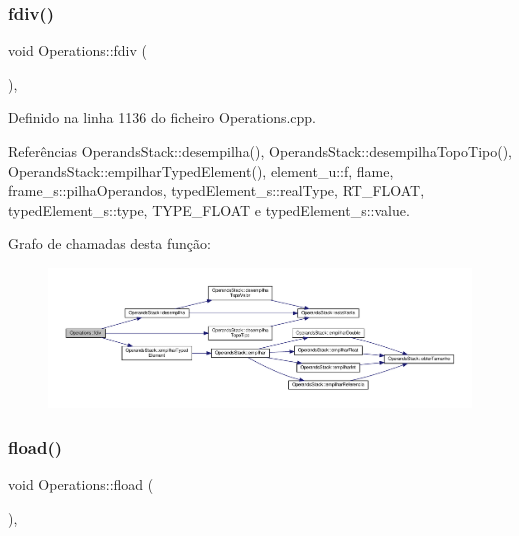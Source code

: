 \subsubsection{\texorpdfstring{fdiv()}{fdiv()}}
{\footnotesize\ttfamily void Operations\+::fdiv (\begin{DoxyParamCaption}{ }\end{DoxyParamCaption})\hspace{0.3cm}{\ttfamily [static]}, {\ttfamily [private]}}



Definido na linha 1136 do ficheiro Operations.\+cpp.



Referências Operands\+Stack\+::desempilha(), Operands\+Stack\+::desempilha\+Topo\+Tipo(), Operands\+Stack\+::empilhar\+Typed\+Element(), element\+\_\+u\+::f, flame, frame\+\_\+s\+::pilha\+Operandos, typed\+Element\+\_\+s\+::real\+Type, R\+T\+\_\+\+F\+L\+O\+AT, typed\+Element\+\_\+s\+::type, T\+Y\+P\+E\+\_\+\+F\+L\+O\+AT e typed\+Element\+\_\+s\+::value.

Grafo de chamadas desta função\+:
\nopagebreak
\begin{figure}[H]
\begin{center}
\leavevmode
\includegraphics[width=350pt]{classOperations_a85d79532189d640a6d02c99f204d2229_cgraph}
\end{center}
\end{figure}
\mbox{\label{classOperations_af6204248b38b7e6af3a4a6d0f805d79f}} 
\subsubsection{\texorpdfstring{fload()}{fload()}}
{\footnotesize\ttfamily void Operations\+::fload (\begin{DoxyParamCaption}{ }\end{DoxyParamCaption})\hspace{0.3cm}{\ttfamily [static]}, {\ttfamily [private]}}



